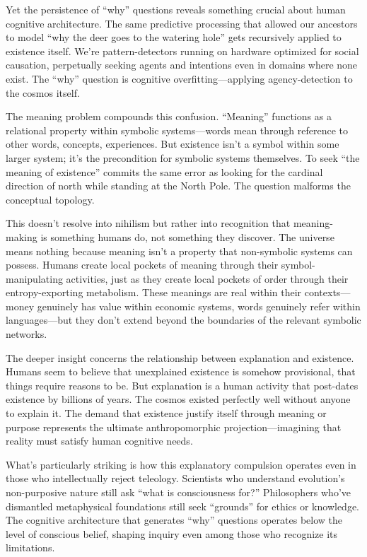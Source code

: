 \documentclass[
  10pt,
]{article}
\begin{document}
Yet the persistence of ``why'' questions reveals something crucial about
human cognitive architecture. The same predictive processing that
allowed our ancestors to model ``why the deer goes to the watering
hole'' gets recursively applied to existence itself. We're
pattern-detectors running on hardware optimized for social causation,
perpetually seeking agents and intentions even in domains where none
exist. The ``why'' question is cognitive overfitting---applying
agency-detection to the cosmos itself.

The meaning problem compounds this confusion. ``Meaning'' functions as a
relational property within symbolic systems---words mean through
reference to other words, concepts, experiences. But existence isn't a
symbol within some larger system; it's the precondition for symbolic
systems themselves. To seek ``the meaning of existence'' commits the
same error as looking for the cardinal direction of north while standing
at the North Pole. The question malforms the conceptual topology.

This doesn't resolve into nihilism but rather into recognition that
meaning-making is something humans do, not something they discover. The
universe means nothing because meaning isn't a property that
non-symbolic systems can possess. Humans create local pockets of meaning
through their symbol-manipulating activities, just as they create local
pockets of order through their entropy-exporting metabolism. These
meanings are real within their contexts---money genuinely has value
within economic systems, words genuinely refer within languages---but
they don't extend beyond the boundaries of the relevant symbolic
networks.

The deeper insight concerns the relationship between explanation and
existence. Humans seem to believe that unexplained existence is somehow
provisional, that things require reasons to be. But explanation is a
human activity that post-dates existence by billions of years. The
cosmos existed perfectly well without anyone to explain it. The demand
that existence justify itself through meaning or purpose represents the
ultimate anthropomorphic projection---imagining that reality must
satisfy human cognitive needs.

What's particularly striking is how this explanatory compulsion operates
even in those who intellectually reject teleology. Scientists who
understand evolution's non-purposive nature still ask ``what is
consciousness for?'' Philosophers who've dismantled metaphysical
foundations still seek ``grounds'' for ethics or knowledge. The
cognitive architecture that generates ``why'' questions operates below
the level of conscious belief, shaping inquiry even among those who
recognize its limitations.
\end{document}
